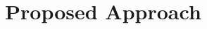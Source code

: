\documentclass[runningheads]{llncs}
\begin{document}






\section{Proposed Approach}
\label{sec:proposed_approach}
\end{document}

